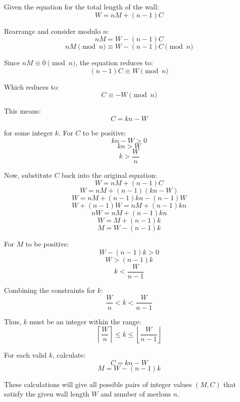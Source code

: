 Given the equation for the total length of the wall:
\[
W = nM + (n-1)C
\]

Rearrange and consider modulo \(n\):
\[
nM = W - (n-1)C
\]
\[
nM \pmod{n} \equiv W - (n-1)C \pmod{n}
\]

Since \(nM \equiv 0 \pmod{n}\), the equation reduces to:
\[
(n-1)C \equiv W \pmod{n}
\]

Which reduces to:
\[
C \equiv -W \pmod{n}
\]

This means:
\[
C = kn - W
\]

for some integer \(k\). For \(C\) to be positive:
\[
kn - W > 0
\]
\[
kn > W
\]
\[
k > \frac{W}{n}
\]

Now, substitute \(C\) back into the original equation:
\[
W = nM + (n-1)C
\]
\[
W = nM + (n-1)(kn - W)
\]
\[
W = nM + (n-1)kn - (n-1)W
\]
\[
W + (n-1)W = nM + (n-1)kn
\]
\[
nW = nM + (n-1)kn
\]
\[
W = M + (n-1)k
\]
\[
M = W - (n-1)k
\]

For \(M\) to be positive:
\[
W - (n-1)k > 0
\]
\[
W > (n-1)k
\]
\[
k < \frac{W}{n-1}
\]

Combining the constraints for \(k\):
\[
\frac{W}{n} < k < \frac{W}{n-1}
\]

Thus, \(k\) must be an integer within the range:
\[
\left\lceil \frac{W}{n} \right\rceil \leq k \leq \left\lfloor \frac{W}{n-1} \right\rfloor
\]

For each valid \(k\), calculate:
\[
C = kn - W
\]
\[
M = W - (n-1)k
\]

These calculations will give all possible pairs of integer values \( (M, C) \) that satisfy the given wall length \( W \) and number of merlons \( n \).
